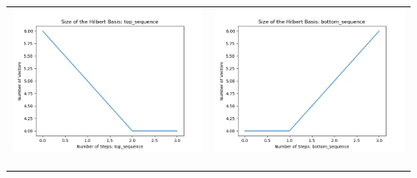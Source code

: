 \documentclass[10pt]{article}
\begin{document}
\begin{tabular}{c|c}
\begin{minipage}{.4\textwidth}
\includegraphics[width=\textwidth]{"DATA/4d/4 generators 2 bound C/top_sequence SIZE"}
\end{minipage} &
\begin{minipage}{.4\textwidth}
\includegraphics[width=\textwidth]{"DATA/4d/4 generators 2 bound C bottomup/bottom_sequence SIZE"}
\end{minipage} \\ \\
\hline \\\begin{minipage}{.4\textwidth}

\end{minipage}
\end{tabular}
\end{document}
